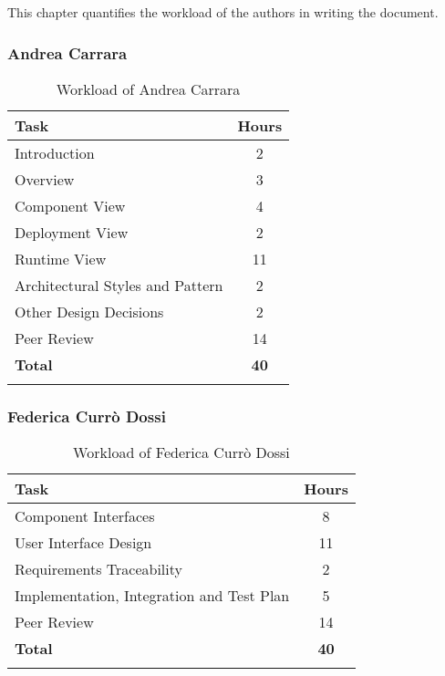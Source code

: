 This chapter quantifies the workload of the authors in writing the document.

\subsubsection{Andrea Carrara}
\renewcommand{\arraystretch}{1.5}
\begin{longtable}{|p{8.5cm}|c|}
    \hline \rowcolor{polimiblue!40}
    \textbf{Task} & \textbf{Hours} \\ \hline
    Introduction & 2  \\ \hline
    Overview & 3 \\ \hline
    Component View & 4\\ \hline
    Deployment View & 2 \\ \hline
    Runtime View & 11 \\ \hline
    Architectural Styles and Pattern & 2 \\ \hline
    Other Design Decisions & 2 \\ \hline
    Peer Review & 14 \\ \hline
    \hline \rowcolor{polimiblue!40}
    \textbf{Total} & \textbf{40} \\ \hline
\caption{Workload of Andrea Carrara}
\end{longtable}

\subsubsection{Federica Currò Dossi}
\renewcommand{\arraystretch}{1.5}
\begin{longtable}{|p{8.5cm}|c|}
    \hline \rowcolor{polimiblue!40}
    \textbf{Task} & \textbf{Hours} \\ \hline
    Component Interfaces & 8\\ \hline
    User Interface Design & 11\\ \hline
    Requirements Traceability & 2 \\ \hline
    Implementation, Integration and Test Plan & 5 \\ \hline
    Peer Review & 14 \\ \hline
    \hline \rowcolor{polimiblue!40}
    \textbf{Total} & \textbf{40} \\ \hline
\caption{Workload of Federica Currò Dossi}
\end{longtable}
